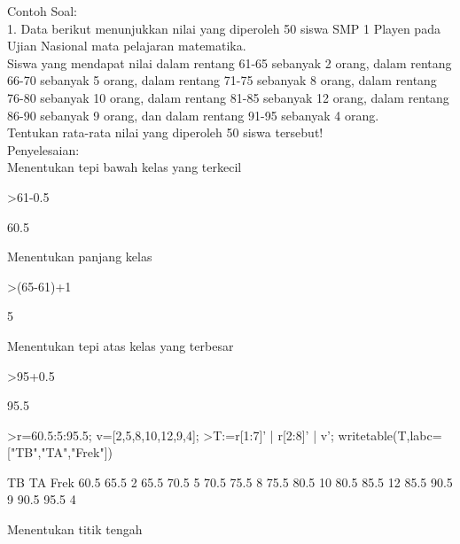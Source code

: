\documentclass[a4paper,10pt]{article}
\begin{document}
\begin{eulernotebook}
\begin{eulercomment}
Contoh Soal:\\
1. Data berikut menunjukkan nilai yang diperoleh 50 siswa SMP 1 Playen
pada Ujian Nasional mata pelajaran matematika.\\
Siswa yang mendapat nilai dalam rentang 61-65 sebanyak 2 orang, dalam
rentang 66-70 sebanyak 5 orang, dalam rentang 71-75 sebanyak 8 orang,
dalam rentang 76-80 sebanyak 10 orang, dalam rentang 81-85 sebanyak 12
orang, dalam rentang 86-90 sebanyak 9 orang, dan dalam rentang 91-95
sebanyak 4 orang.\\
Tentukan rata-rata nilai yang diperoleh 50 siswa tersebut!\\
Penyelesaian:\\
Menentukan tepi bawah kelas yang terkecil
\end{eulercomment}
\begin{eulerprompt}
>61-0.5
\end{eulerprompt}
\begin{euleroutput}
  60.5
\end{euleroutput}
\begin{eulercomment}
Menentukan panjang kelas
\end{eulercomment}
\begin{eulerprompt}
>(65-61)+1
\end{eulerprompt}
\begin{euleroutput}
  5
\end{euleroutput}
\begin{eulercomment}
Menentukan tepi atas kelas yang terbesar
\end{eulercomment}
\begin{eulerprompt}
>95+0.5
\end{eulerprompt}
\begin{euleroutput}
  95.5
\end{euleroutput}
\begin{eulerprompt}
>r=60.5:5:95.5; v=[2,5,8,10,12,9,4];
>T:=r[1:7]' | r[2:8]' | v'; writetable(T,labc=["TB","TA","Frek"])
\end{eulerprompt}
\begin{euleroutput}
          TB        TA      Frek
        60.5      65.5         2
        65.5      70.5         5
        70.5      75.5         8
        75.5      80.5        10
        80.5      85.5        12
        85.5      90.5         9
        90.5      95.5         4
\end{euleroutput}
\begin{eulercomment}
Menentukan titik tengah
\end{eulercomment}

\end{eulernotebook}
\end{document}

